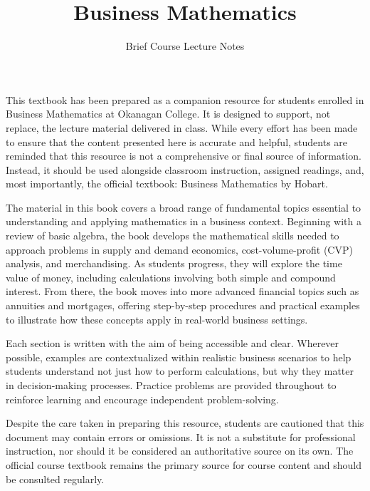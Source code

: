 \documentclass[
]{book}
\title{Business Mathematics}
\author{Brief Course Lecture Notes}
\date{}
\begin{document}
\maketitle

{
\setcounter{tocdepth}{1}
\tableofcontents
}
\chapter*{}\label{section}

This textbook has been prepared as a companion resource for students enrolled in Business Mathematics at Okanagan College. It is designed to support, not replace, the lecture material delivered in class. While every effort has been made to ensure that the content presented here is accurate and helpful, students are reminded that this resource is not a comprehensive or final source of information. Instead, it should be used alongside classroom instruction, assigned readings, and, most importantly, the official textbook: Business Mathematics by Hobart.

The material in this book covers a broad range of fundamental topics essential to understanding and applying mathematics in a business context. Beginning with a review of basic algebra, the book develops the mathematical skills needed to approach problems in supply and demand economics, cost-volume-profit (CVP) analysis, and merchandising. As students progress, they will explore the time value of money, including calculations involving both simple and compound interest. From there, the book moves into more advanced financial topics such as annuities and mortgages, offering step-by-step procedures and practical examples to illustrate how these concepts apply in real-world business settings.

Each section is written with the aim of being accessible and clear. Wherever possible, examples are contextualized within realistic business scenarios to help students understand not just how to perform calculations, but why they matter in decision-making processes. Practice problems are provided throughout to reinforce learning and encourage independent problem-solving.

Despite the care taken in preparing this resource, students are cautioned that this document may contain errors or omissions. It is not a substitute for professional instruction, nor should it be considered an authoritative source on its own. The official course textbook remains the primary source for course content and should be consulted regularly.
\end{document}
